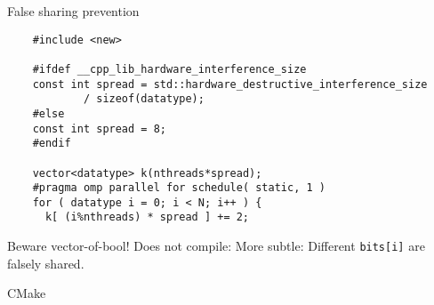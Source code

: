 \documentclass[11pt,headernav]{beamer}
\begin{document}
\begin{numberedframe}{False sharing prevention}
  \begin{lstlisting}
    #include <new>

    #ifdef __cpp_lib_hardware_interference_size
    const int spread = std::hardware_destructive_interference_size
            / sizeof(datatype);
    #else
    const int spread = 8;
    #endif

    vector<datatype> k(nthreads*spread);
    #pragma omp parallel for schedule( static, 1 )
    for ( datatype i = 0; i < N; i++ ) {
      k[ (i%nthreads) * spread ] += 2;
  \end{lstlisting}
\end{numberedframe}

\begin{numberedframe}{Beware vector-of-bool!}
  Does not compile:
  More subtle:
  Different \lstinline{bits[i]} are falsely shared.
\end{numberedframe}

\begin{numberedframe}{CMake}
  
\end{numberedframe}
\end{document}
